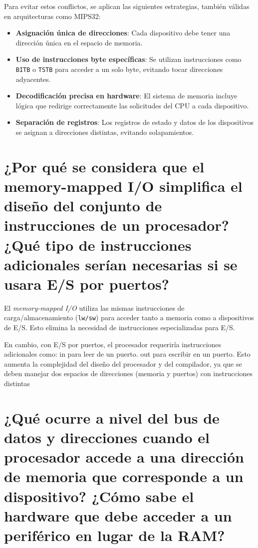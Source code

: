 \documentclass{article}
\begin{document}
\begin{itemize}
Para evitar estos conflictos, se aplican las siguientes estrategias, también válidas en arquitecturas como MIPS32:

\begin{itemize}[label=--]
    \item \textbf{Asignación única de direcciones}: Cada dispositivo debe tener una dirección única en el espacio de memoria.
    \item \textbf{Uso de instrucciones byte específicas}: Se utilizan instrucciones como \texttt{BITB} o \texttt{TSTB} para acceder a un solo byte, evitando tocar direcciones adyacentes.
    \item \textbf{Decodificación precisa en hardware}: El sistema de memoria incluye lógica que redirige correctamente las solicitudes del CPU a cada dispositivo.
    \item \textbf{Separación de registros}: Los registros de estado y datos de los dispositivos se asignan a direcciones distintas, evitando solapamientos.
\end{itemize}

\section{¿Por qué se considera que el memory-mapped I/O simplifica el diseño del conjunto de instrucciones de un procesador? ¿Qué tipo de instrucciones adicionales serían necesarias si se usara E/S por puertos?}

El \textit{memory-mapped I/O} utiliza las mismas instrucciones de carga/almacenamiento (\texttt{lw/sw}) para acceder tanto a memoria como a dispositivos de E/S. Esto elimina la necesidad de instrucciones especializadas para E/S.

En cambio, con E/S por puertos, el procesador requeriría instrucciones adicionales como:
 in para leer de un puerto.
 out para escribir en un puerto.
 Esto aumenta la complejidad del diseño del procesador y del compilador, ya que
 se deben manejar dos espacios de direcciones (memoria y puertos) con instrucciones distintas

\section{¿Qué ocurre a nivel del bus de datos y direcciones cuando el procesador accede a una dirección de memoria que corresponde a un dispositivo? ¿Cómo sabe el hardware que debe acceder a un periférico en lugar de la RAM?}


\end{itemize}
\end{document}

